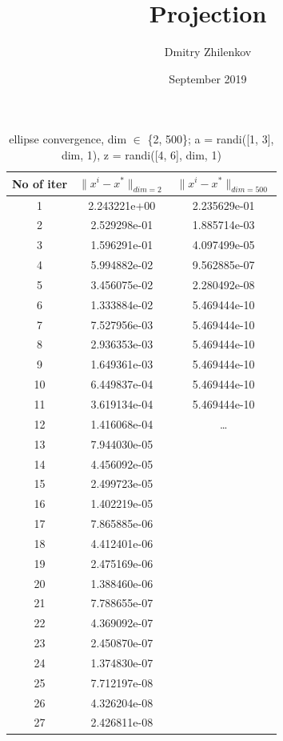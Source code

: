 \documentclass{article}
\title{Projection}
\author{Dmitry Zhilenkov}
\date{September 2019}
\begin{document}
\begin{table}[H]
    \centering
    \caption{ellipse convergence, dim \(\in\) \{2, 500\}; a = randi([1, 3], dim, 1), z = randi([4, 6], dim, 1)}
    \begin{tabular}{c|c|c}
        No of iter & \(\| x^i - x^*  \|_{dim = 2}\) & \(\| x^i - x^*  \|_{dim = 500}\) \\
        \hline
        1 & 2.243221e+00 & 2.235629e-01 \\
        2 & 2.529298e-01 & 1.885714e-03 \\
        3 & 1.596291e-01 & 4.097499e-05 \\
        4 & 5.994882e-02 & 9.562885e-07 \\
        5 & 3.456075e-02 & 2.280492e-08 \\
        6 & 1.333884e-02 & 5.469444e-10 \\
        7 & 7.527956e-03 & 5.469444e-10 \\
        8 & 2.936353e-03 & 5.469444e-10 \\
        9 & 1.649361e-03 & 5.469444e-10 \\
        10 & 6.449837e-04 & 5.469444e-10\\
        11 & 3.619134e-04 & 5.469444e-10\\
        12 & 1.416068e-04 & \dots \\
        13 & 7.944030e-05 \\
        14 & 4.456092e-05 \\
        15 & 2.499723e-05 \\ 
        16 & 1.402219e-05 \\ 
        17 & 7.865885e-06 \\ 
        18 & 4.412401e-06 \\
        19 & 2.475169e-06 \\
        20 & 1.388460e-06 \\
        21 & 7.788655e-07 \\
        22 & 4.369092e-07 \\
        23 & 2.450870e-07 \\
        24 & 1.374830e-07 \\
        25 & 7.712197e-08 \\
        26 & 4.326204e-08 \\
        27 & 2.426811e-08 
    \end{tabular}
    \label{tab:my_label}
\end{table}
\end{document}
